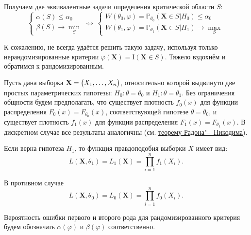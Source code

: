Получаем две эквивалентные задачи определения критической области $S$:
\begin{equation*}
    \begin{cases}
        \alpha(S) \leqslant \alpha_{0} \\
        \beta(S) \rightarrow \min\limits_{S}
    \end{cases}
    \Leftrightarrow~
    \begin{cases}
        W(\theta_0, \varphi) = \mathbb{P}_{\theta_0} (\mathbf{X} \in S | H_0) \leqslant \alpha_0  \\
        W(\theta_1, \varphi) = \mathbb{P}_{\theta_1} (\mathbf{X} \in S | H_1) \rightarrow \max\limits_{S} 
    \end{cases}
\end{equation*}

К сожалению, не всегда удаётся решить такую задачу, используя только нерандомизированные критерии $\varphi(\mathbf{X}) = \mathrm{I}(\mathbf{X} \in S)$.
Тяжело вздохнём и обратимся к рандомизированным.

Пусть дана выборка $\mathbf{X} = \bigl( X_1, \ldots, X_n \bigr)$, относительно которой выдвинуто две простых параметрических гипотезы: 
$H_0\colon \theta = \theta_0$ и $H_1\colon \theta = \theta_1$.
Без ограничения общности будем предполагать, что существует плотность $f_{0}(x)$ для функции распределения $F_{0}(x) = F_{\theta_0}(x)$, соответствующей гипотезе $\theta = \theta_0$, 
и существует плотность $f_{1}(x)$ для функции распределения $F_{1}(x) = F_{\theta_1}(x)$.
В дискретном случае все результаты аналогичны (см. \hyperlink{Radon_Nikodim_thm}{теорему Радона"--~Никодима}).

Если верна гипотеза $H_1$, то функция правдоподобия выборки $X$ имеет вид:
\begin{equation*}
    L(\mathbf{X}, \theta_1) =  L_{1}\left(\mathbf{X}\right) = \prod_{i=1}^{n} f_{1}\left(X_{i}\right).
\end{equation*}

В противном случае 
\begin{equation*}
    L(\mathbf{X}, \theta_0) = L_{0}\left(\mathbf{X}\right) = \prod_{i=1}^{n} f_{0}\left(X_{i}\right).
\end{equation*}

\begin{rmrk}
    Вероятность ошибки первого и второго рода для рандомизированного критерия будем обозначать
    $\alpha(\varphi)$ и $\beta(\varphi)$ соответственно.
\end{rmrk}

